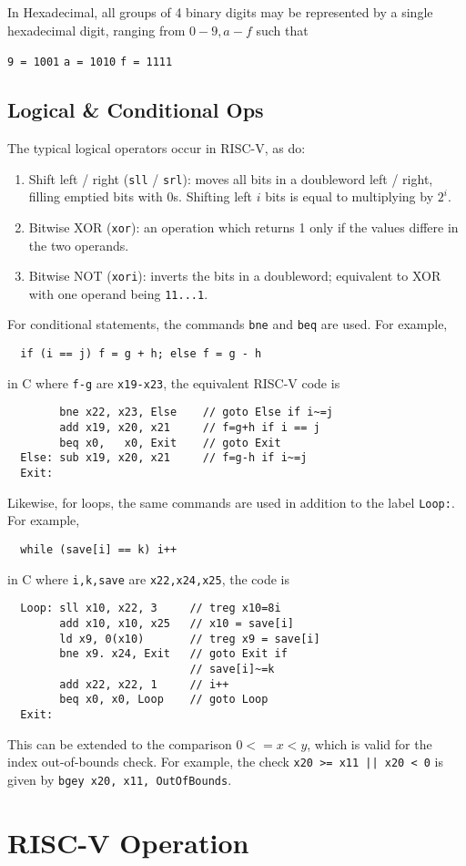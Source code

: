\documentclass{tufte-book}
\begin{document}
In Hexadecimal, all groups of 4 binary digits may be represented by a single hexadecimal digit, ranging from $0 - 9, a - f$ such that \begin{center}
  \verb|9 = 1001| \qquad \verb|a = 1010| \qquad \verb|f = 1111|
\end{center}

\section{Logical \& Conditional Ops}
The typical logical operators occur in RISC-V, as do:
\begin{enumerate}
  \item Shift left / right (\verb|sll| / \verb|srl|): moves all bits in a doubleword left / right, filling emptied bits with 0s. Shifting left $i$ bits is equal to multiplying by $2^i$.
  \item Bitwise XOR (\verb|xor|): an operation which returns 1 only if the values differe in the two operands.
  \item Bitwise NOT (\verb|xori|): inverts the bits in a doubleword; equivalent to XOR with one operand being \verb|11...1|.
\end{enumerate}
For conditional statements, the commands \verb|bne| and \verb|beq| are used. For example,
\begin{verbatim}
  if (i == j) f = g + h; else f = g - h
\end{verbatim}
in C where \verb|f-g| are \verb|x19-x23|, the equivalent RISC-V code is \begin{lstlisting}
        bne x22, x23, Else    // goto Else if i~=j
        add x19, x20, x21     // f=g+h if i == j
        beq x0,   x0, Exit    // goto Exit
  Else: sub x19, x20, x21     // f=g-h if i~=j
  Exit:
\end{lstlisting}
Likewise, for loops, the same commands are used in addition to the label \verb|Loop:|. For example,
\begin{verbatim}
  while (save[i] == k) i++
\end{verbatim}
in C where \verb|i,k,save| are \verb|x22,x24,x25|, the code is \begin{lstlisting}
  Loop: sll x10, x22, 3     // treg x10=8i
        add x10, x10, x25   // x10 = save[i]
        ld x9, 0(x10)       // treg x9 = save[i]
        bne x9. x24, Exit   // goto Exit if
                            // save[i]~=k
        add x22, x22, 1     // i++
        beq x0, x0, Loop    // goto Loop
  Exit:
\end{lstlisting}
This can be extended to the comparison $0 <= x < y$, which is valid for the index out-of-bounds check. For example, the check \verb$x20 >= x11 || x20 < 0$ is given by \verb$bgey x20, x11, OutOfBounds$.

\chapter{RISC-V Operation}
\end{document}
